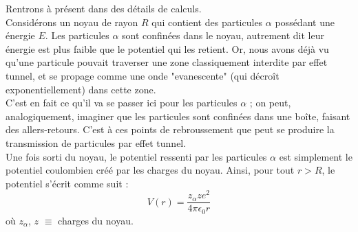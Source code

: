 \documentclass{book}
\begin{document}
Rentrons à présent dans des détails de calculs. \\
Considérons un noyau de rayon $R$ qui contient des particules $\alpha$ possédant une énergie $E$. 
Les particules $\alpha$ sont confinées dans le noyau, autrement dit leur énergie est plus faible que le potentiel qui les retient.
Or, nous avons déjà vu qu'une particule pouvait traverser une zone classiquement interdite par effet tunnel, et se propage comme une onde "evanescente" (qui décroît exponentiellement) dans cette zone. \\
C'est en fait ce qu'il va se passer ici pour les particules $\alpha$ ; on peut, analogiquement, imaginer que les particules sont confinées dans une boîte, faisant des allers-retours. C'est à ces points de rebroussement que peut se produire la transmission de particules par effet tunnel. \\

Une fois sorti du noyau, le potentiel ressenti par les particules $\alpha$ est simplement le potentiel coulombien créé par les charges du noyau. Ainsi, pour tout $r > R$, le potentiel s'écrit comme suit :
\begin{equation}
  V(r) = \frac{z_{\alpha} z e^2}{4 \pi \epsilon_0 r} %
\end{equation}
où $z_{\alpha}$, $z$ $\equiv$ charges du noyau. \\
\end{document}
